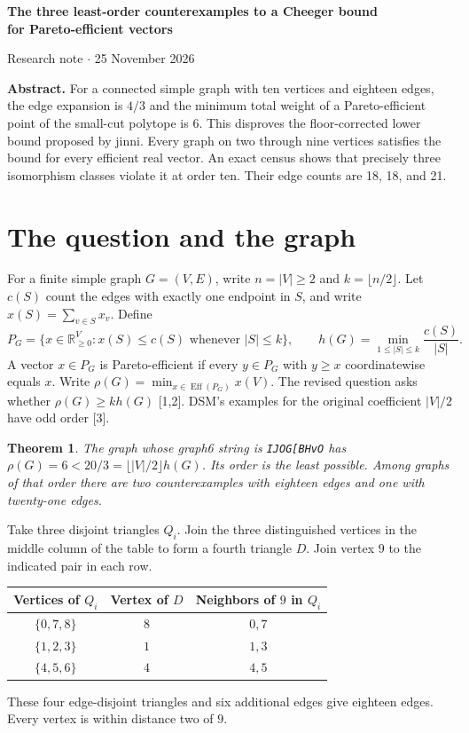 \documentclass[11pt,a4paper]{article}
\newcommand{\cut}{c}
\newcommand{\RR}{\mathbb R}
\newcommand{\eff}{\operatorname{Eff}}
\newtheorem*{theorem}{Theorem}
\begin{document}
\begin{center}
{\Large\bfseries The three least-order counterexamples to a Cheeger bound\\[3pt]
for Pareto-efficient vectors\par}
\smallskip
{\small Research note \(\cdot\) 25 November 2026}
\end{center}

\textbf{Abstract.}
For a connected simple graph with ten vertices and eighteen edges, the edge
expansion is \(4/3\) and the minimum total weight of a Pareto-efficient point
of the small-cut polytope is \(6\). This disproves the floor-corrected lower
bound proposed by jinni. Every graph on two through nine vertices satisfies
the bound for every efficient real vector. An exact census shows that
precisely three isomorphism classes violate it at order ten. Their edge
counts are 18, 18, and 21.

\section*{The question and the graph}
For a finite simple graph \(G=(V,E)\), write \(n=|V|\ge2\) and
\(k=\lfloor n/2\rfloor\). Let \(\cut(S)\) count the edges with exactly one endpoint
in \(S\), and write \(x(S)=\sum_{v\in S}x_v\). Define
\[
P_G=\{x\in\RR_{\ge0}^{V}:x(S)\le\cut(S)\text{ whenever }|S|\le k\},
\qquad h(G)=\min_{1\le |S|\le k}\frac{\cut(S)}{|S|}.
\]
A vector \(x\in P_G\) is Pareto-efficient if every \(y\in P_G\) with
\(y\ge x\) coordinatewise equals \(x\). Write \(\rho(G)=\min_{x\in\eff(P_G)}x(V)\).
The revised question asks whether \(\rho(G)\ge k h(G)\) [1,2].
DSM's examples for the original coefficient \(|V|/2\) have odd order [3].

\begin{theorem}
The graph whose graph6 string is \textnormal{\texttt{IJOG[BHvO}} has
\(\rho(G)=6<20/3=\lfloor |V|/2\rfloor h(G)\).
Its order is the least possible. Among graphs of that order there are two
counterexamples with eighteen edges and one with twenty-one edges.
\end{theorem}

Take three disjoint triangles \(Q_i\). Join the three distinguished vertices
in the middle column of the table to form a fourth triangle \(D\).
Join vertex \(9\) to the indicated pair in each row.
\begin{center}
\begin{tabular}{ccc}\toprule
Vertices of \(Q_i\) & Vertex of \(D\) & Neighbors of \(9\) in \(Q_i\)\\ \midrule
\(\{0,7,8\}\) & \(8\) & \(0,7\)\\
\(\{1,2,3\}\) & \(1\) & \(1,3\)\\
\(\{4,5,6\}\) & \(4\) & \(4,5\)\\ \bottomrule
\end{tabular}
\end{center}
These four edge-disjoint triangles and six additional edges give eighteen edges.
Every vertex is within distance two of \(9\).
\end{document}
